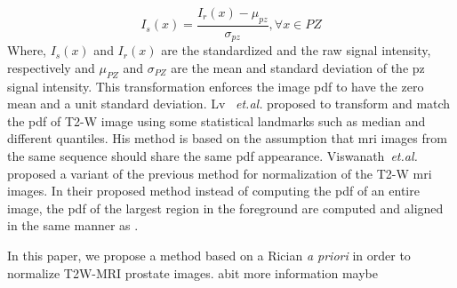 \begin{equation}
	I_{s}(x) = \frac{I_{r}(x)- \mu_{pz}}{\sigma_{pz}}, \forall x\in PZ
\end{equation}
\noindent Where, $I_{s}(x)$ and $I_{r}(x)$ are the standardized and the raw signal intensity, respectively and $\mu_{PZ}$ and $\sigma_{PZ}$ are the mean and standard deviation of the \ac{pz} signal intensity. 
This transformation enforces the image \ac{pdf} to have the zero mean and a unit standard deviation.
Lv ~\textit{et.al.}\cite{lv2009computerized} proposed to transform and match the \ac{pdf} of T2-W image using some statistical landmarks such as median and different quantiles. 
His method is based on the assumption that \ac{mri} images from the same sequence should share the same \ac{pdf} appearance.
Viswanath~\textit{et.al.} \cite{viswanath2012central} proposed a variant of the previous method for normalization of the T2-W \ac{mri} images. 
In their proposed method instead of computing the \ac{pdf} of an entire image, the \ac{pdf} of the largest region in the foreground are computed and aligned in the same manner as \cite{lv2009computerized}.

In this paper, we propose a method based on a Rician \textit{a priori} in order to normalize T2W-MRI prostate images.
{\color{red} abit more information maybe}





